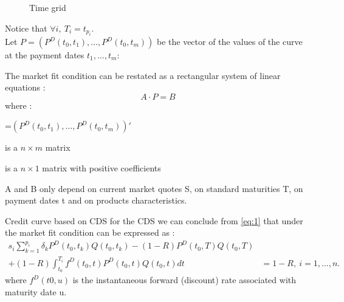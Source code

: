 \begin{figure}[H]
  \centering
  \caption{Time grid }
  \label{fig:3}
\end{figure}

Notice that $\forall i, \ T_i=t_{p_i}$.\\


Let $P=(P^D(t_0,t_1),\dots,P^D(t_0,t_m))$  be the  vector of  the values  of the
curve at the payment dates $t_1,\dots,t_m$:

The  market fit  condition can  be restated  as a  rectangular system  of linear
equations :
\[
A \cdot P=B
\]
where :
\begin{description}
\item[P] =$(P^D(t_0,t_1),\dots,P^D(t_0,t_m))'$ 
\item[A] is a $n \times m$ matrix
\item[B] is a $n \times 1$ matrix with positive coefficients
\item A and B only depend on current market quotes S, on standard maturities T, on payment dates t and on products characteristics.
\end{description}

\begin{example}{Credit curve based on CDS}
  for  the  CDS we  can  conclude  from \ref{eq:1}  that  under  the market  fit
  condition can be expressed as :
  \begin{eqnarray*}
    \label{eq:2}
    s_i\sum^{p_i}_{k=1}\delta_kP^D(t_0,t_k)Q(t_0,t_k)        -       (1        -
    R)P^D(t_0,T)Q(t_0,T) & \\
    + (1 - R)\int^{T_i}_{t_0}f^D(t_0,t)P^D(t_0,t)Q(t_0,t)dt & = 1 - R,\ i=1,\dots,n.
  \end{eqnarray*}
  where $f^D(t0, u)$ is the instantaneous forward (discount) rate associated with
  maturity date u.
\end{example}

